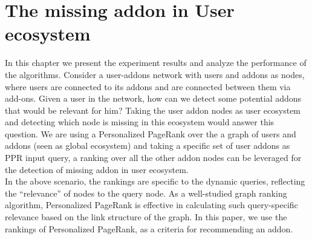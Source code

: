 \documentclass[11pt,oneside]{book}
\begin{document}
\chapter{The missing addon in User ecosystem}
\label{chap:user_ecosystem}

In this chapter we present the experiment results and analyze the performance of the algorithms.
Consider a user-addons network
with users and addons as nodes, where users are connected to its addons and are connected between them via add-ons. Given a user
in the network, how can we detect some potential addons that would be relevant for him? Taking the user addon nodes as user ecosystem and detecting which node is missing in this ecosystem would answer this question. We are using a Personalized PageRank over the a graph of users and addons (seen as global ecosystem) and taking a specific set of user addons as PPR input query, a ranking over all the
other addon nodes can be leveraged for the detection of missing addon in user ecosystem.\\
In the above scenario, the rankings are specific to the dynamic
queries, reflecting the “relevance” of nodes to the query node. As a
well-studied graph ranking algorithm, Personalized PageRank \citep{page1999pagerank} is effective in calculating such query-specific relevance based
on the link structure of the graph. In this paper, we use the rankings of Personalized PageRank, as a criteria for recommending an addon.
\end{document}
